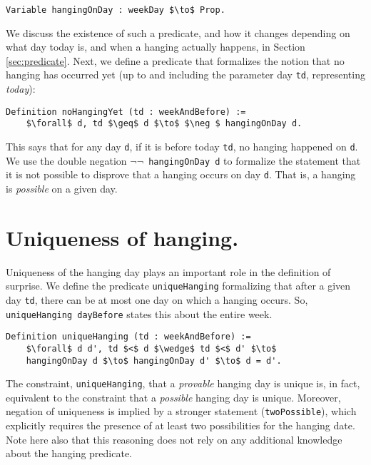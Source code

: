\documentclass[runningheads]{llncs}
\begin{document}
\begin{lstlisting}[mathescape=true]
  Variable hangingOnDay : weekDay $\to$ Prop.
\end{lstlisting}

We discuss the existence of such a predicate, and how it changes depending
on what day today is, and when a hanging actually happens, in Section \ref{sec:predicate}.
Next, we define a predicate that formalizes the notion that no hanging has occurred
yet (up to and including the parameter day {\tt td}, representing \emph{today}):

\begin{lstlisting}[mathescape=true]
  Definition noHangingYet (td : weekAndBefore) :=
    $\forall$ d, td $\geq$ d $\to$ $\neg $ hangingOnDay d.
\end{lstlisting}

This says that for any day {\tt d}, if it is before today {\tt td}, no hanging
happened on {\tt d}.
We use the double negation {\tt $\neg \neg$ hangingOnDay d} to formalize the statement that it is
not possible to disprove that a hanging occurs on day {\tt d}. That is, a hanging
is \emph{possible} on a given day.

\section{Uniqueness of hanging. }
\label{sec:unique}

Uniqueness of the hanging day plays an important role in the definition of surprise.
We define the predicate {\tt uniqueHanging} formalizing that after a given day {\tt td},
there can be at most one day on which a hanging occurs. So,
{\tt uniqueHanging dayBefore} states this about the entire week.

\begin{lstlisting}[mathescape=true]
  Definition uniqueHanging (td : weekAndBefore) :=
    $\forall$ d d', td $<$ d $\wedge$ td $<$ d' $\to$
    hangingOnDay d $\to$ hangingOnDay d' $\to$ d = d'.
\end{lstlisting}

The constraint, {\tt uniqueHanging}, that
a \emph{provable} hanging day is unique is, in fact, equivalent to the constraint
that a \emph{possible} hanging day is unique. Moreover, negation of uniqueness
is implied by a stronger statement ({\tt twoPossible}), which explicitly
requires the presence of at least two possibilities for the hanging date.
Note here also that this reasoning does not rely on any additional knowledge about
the hanging predicate.
\end{document}

